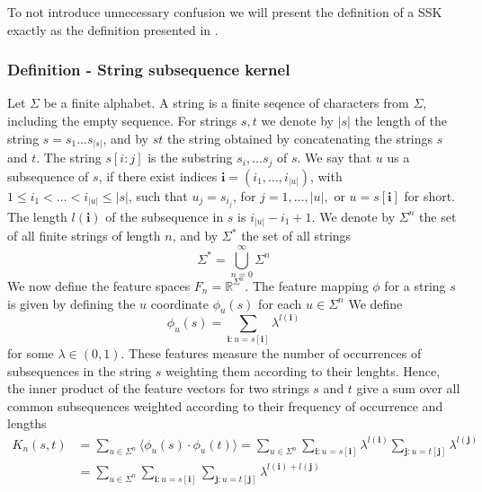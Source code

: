 To not introduce unnecessary confusion we will present the definition of a SSK exactly as the definition presented in \cite{lodhi}. 

\subsubsection{Definition - String subsequence kernel}
Let $ \Sigma $ be a finite alphabet. A string is a finite seqence of characters from $ \Sigma $, including the empty sequence. For strings $s,t$ we denote by $|s|$ the length of the string $ s = s_1 \dots s_{|s|} $, and by $ st $ the string obtained by concatenating the strings $ s $ and $ t $. The string $ s[i:j] $ is the substring $ s_i, \dots s_j $ of $ s $. We say that $ u $ us a subsequence of $ s $, if there exist indices $ \boldsymbol{i} = (i_1, \dots, i_{|u|}) $, with $ 1 \leq i_1 < \dots < i_{|u|} \leq |s| $, such that $ u_j = s_{i_{j}}$, for $ j = 1, \dots, |u|, $ or $ u = s[\boldsymbol{i}] $ for short. The length $ l(\boldsymbol{i}) $ of the subsequence in $ s $ is $ i_{|u|} - i_1 +1 $. We denote by $ \Sigma^n $ the set of all finite strings of length $ n $, and by $ \Sigma^* $ the set of all strings 
\begin{equation}\label{eq:all_Strings}
\Sigma^* = \bigcup^{\infty}_{n=0}\Sigma^n
\end{equation}
We now define the feature spaces $ F_n = \mathbb{R}^{\Sigma^{n}} $. The feature mapping $ \phi $ for a string $ s $ is given by defining the $ u $ coordinate $ \phi_u(s) $ for each $u \in \Sigma^n  $ We define 
\begin{equation}
\phi_u(s) = \sum_{\boldsymbol{i}:u=s[\boldsymbol{i}]} \lambda^{l(\boldsymbol{i})}
\end{equation}
for some $ \lambda \in (0,1) $. These features measure the number of occurrences of subsequences in the string $ s $ weighting them according to their lenghts. Hence, the inner product of the feature vectors for two strings $ s $ and $ t $ give a sum over all common subsequences weighted according to their frequency of occurrence and lengths
\begin{align*}\label{key}
K_n(s,t) &= \sum_{u\in\Sigma^n} \langle \phi_u(s) \cdot \phi_u(t) \rangle = \sum_{u \in \Sigma^n} \sum_{\boldsymbol{i}:u=s[\boldsymbol{i}]} \lambda^{l(\boldsymbol{i})} \sum_{\boldsymbol{j}:u=t[\boldsymbol{j}]} \lambda^{l(\boldsymbol{j})} \\
& =  \sum_{u \in \Sigma^n} \sum_{\boldsymbol{i}:u=s[\boldsymbol{i}]}  \sum_{\boldsymbol{j}:u=t[\boldsymbol{j}]} \lambda^{l(\boldsymbol{i}) + l(\boldsymbol{j})}
\end{align*}


